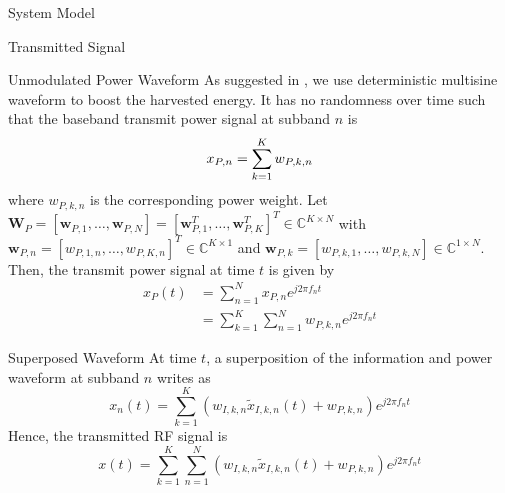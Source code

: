\documentclass{IEEEtran}
\begin{document}
\begin{section}{System Model}
\begin{subsection}{Transmitted Signal}
		\begin{subsubsection}{Unmodulated Power Waveform}
			As suggested in \cite{Clerckx2018b,Clerckx2016a}, we use deterministic multisine waveform to boost the harvested energy. It has no randomness over time such that the baseband transmit power signal at subband $n$ is
			\begin{equation}\label{eq:x_{P,n}}
				x_{P,n}=\sum_{k=1}^K{w_{P,k,n}}
			\end{equation}
			where $w_{P,k,n}$ is the corresponding power weight. Let $\boldsymbol{W}_P=[\boldsymbol{w}_{P,1},\dots,\boldsymbol{w}_{P,N}]=[\boldsymbol{w}_{P,1}^T,\dots,\boldsymbol{w}_{P,K}^T]^T \in \mathbb{C}^{K \times N}$ with $\boldsymbol{w}_{P,n}=[w_{P,1,n},\dots,w_{P,K,n}]^T \in \mathbb{C}^{K \times 1}$ and $\boldsymbol{w}_{P,k}=[w_{P,k,1},\dots,w_{P,k,N}] \in \mathbb{C}^{1 \times N}$. Then, the transmit power signal at time $t$ is given by
			\begin{equation}\label{eq:x_P(t)}
				\begin{split}
					x_P(t)
					&=\sum_{n=1}^N{x_{P,n}{e^{j2{\pi}{f_n}{t}}}}\\
					&=\sum_{k=1}^K\sum_{n=1}^N{w_{P,k,n}{e^{j2{\pi}{f_n}{t}}}}
				\end{split}
			\end{equation}
		\end{subsubsection}

		\begin{subsubsection}{Superposed Waveform}
			At time $t$, a superposition of the information and power waveform at subband $n$ writes as
			\begin{equation}\label{eq:x_n(t)}
				x_n(t)=\sum_{k=1}^K{(w_{I,k,n}\tilde{x}_{I,k,n}(t)+w_{P,k,n}){e^{j2{\pi}{f_n}{t}}}}
			\end{equation}
			Hence, the transmitted RF signal is
			\begin{equation}\label{eq:x(t)}
				x(t)=\sum_{k=1}^K\sum_{n=1}^N{(w_{I,k,n}\tilde{x}_{I,k,n}(t)+w_{P,k,n}){e^{j2{\pi}{f_n}{t}}}}
			\end{equation}
		\end{subsubsection}
	\end{subsection}


\end{section}
\end{document}
